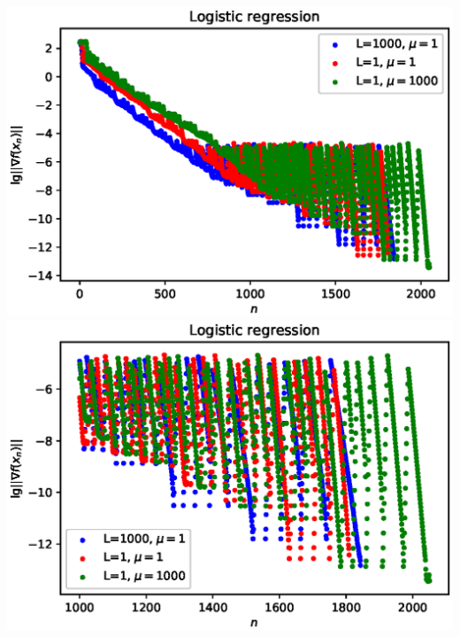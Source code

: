 \documentclass{crm-article}
\begin{document}
\noindent
\includegraphics[scale=0.5]{plots/algm1.eps}
\includegraphics[scale=0.5]{plots/algm2.eps}
\end{document}
